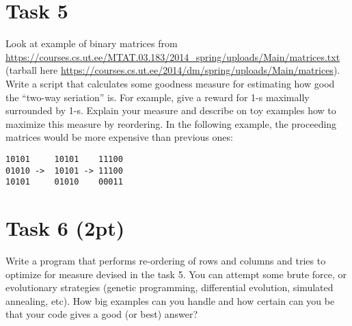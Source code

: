 \documentclass{article}
\begin{document}
\section*{Task 5}
Look at example of binary matrices from \url{https://courses.cs.ut.ee/MTAT.03.183/2014_spring/uploads/Main/matrices.txt} (tarball here \url{https://courses.cs.ut.ee/2014/dm/spring/uploads/Main/matrices}). Write a script that calculates some goodness measure for estimating how good the “two-way seriation” is. For example, give a reward for 1-s maximally surrounded by 1-s. Explain your measure and describe on toy examples how to maximize this measure by reordering. In the following example, the proceeding matrices would be more expensive than previous ones:
\begin{verbatim}
10101     10101    11100
01010 ->  10101 -> 11100
10101     01010    00011 
\end{verbatim}


\section*{Task 6 (2pt)}
Write a program that performs re-ordering of rows and columns and tries to optimize for measure devised in the task 5. You can attempt some brute force, or evolutionary strategies (genetic programming, differential evolution, simulated annealing, etc). How big examples can you handle and how certain can you be that your code gives a good (or best) answer?
\end{document}

